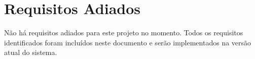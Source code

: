 \section{Requisitos Adiados}

Não há requisitos adiados para este projeto no momento. Todos os requisitos identificados foram incluídos neste documento e serão implementados na versão atual do sistema.
